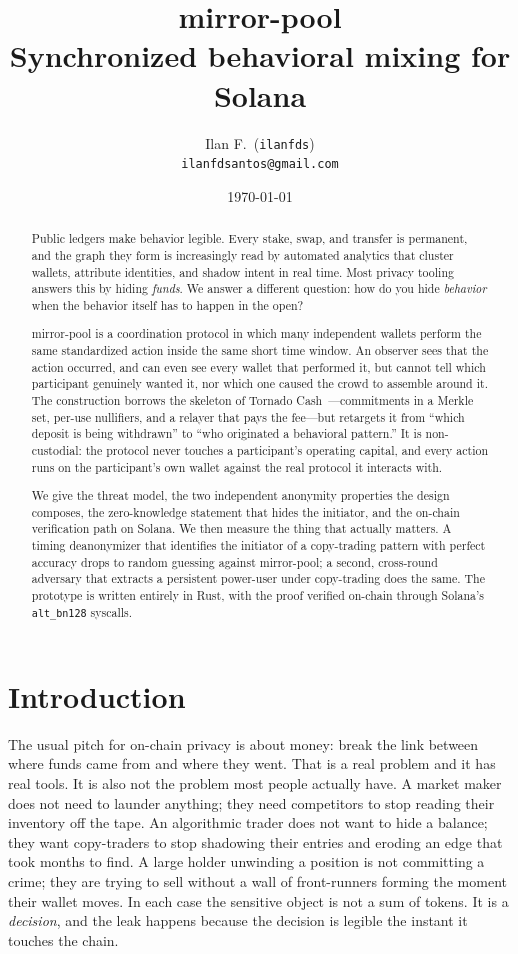 \documentclass[11pt]{article}
\title{\textbf{mirror-pool}\\[2pt]
\large Synchronized behavioral mixing for Solana}
\author{Ilan F.\ (\texttt{ilanfds})\\ \texttt{ilanfdsantos@gmail.com}}
\date{\today}
\newcommand{\code}[1]{\texttt{#1}}
\begin{document}
\maketitle

\begin{abstract}
\noindent
Public ledgers make behavior legible. Every stake, swap, and transfer is
permanent, and the graph they form is increasingly read by automated analytics
that cluster wallets, attribute identities, and shadow intent in real time. Most
privacy tooling answers this by hiding \emph{funds}. We answer a different
question: how do you hide \emph{behavior} when the behavior itself has to happen
in the open?

mirror-pool is a coordination protocol in which many independent wallets perform
the same standardized action inside the same short time window. An observer sees
that the action occurred, and can even see every wallet that performed it, but
cannot tell which participant genuinely wanted it, nor which one caused the crowd
to assemble around it. The construction borrows the skeleton of Tornado
Cash~\cite{tornado}---commitments in a Merkle set, per-use nullifiers, and a
relayer that pays the fee---but retargets it from ``which deposit is being
withdrawn'' to ``who originated a behavioral pattern.'' It is non-custodial: the
protocol never touches a participant's operating capital, and every action runs
on the participant's own wallet against the real protocol it interacts with.

We give the threat model, the two independent anonymity properties the design
composes, the zero-knowledge statement that hides the initiator, and the on-chain
verification path on Solana. We then measure the thing that actually matters. A
timing deanonymizer that identifies the initiator of a copy-trading pattern with
perfect accuracy drops to random guessing against mirror-pool; a second,
cross-round adversary that extracts a persistent power-user under copy-trading
does the same. The prototype is written entirely in Rust, with the proof verified
on-chain through Solana's \code{alt\_bn128} syscalls.
\end{abstract}

\section{Introduction}

The usual pitch for on-chain privacy is about money: break the link between where
funds came from and where they went. That is a real problem and it has real
tools. It is also not the problem most people actually have. A market maker does
not need to launder anything; they need competitors to stop reading their
inventory off the tape. An algorithmic trader does not want to hide a balance;
they want copy-traders to stop shadowing their entries and eroding an edge that
took months to find. A large holder unwinding a position is not committing a
crime; they are trying to sell without a wall of front-runners forming the moment
their wallet moves. In each case the sensitive object is not a sum of tokens. It
is a \emph{decision}, and the leak happens because the decision is legible the
instant it touches the chain.
\end{document}
